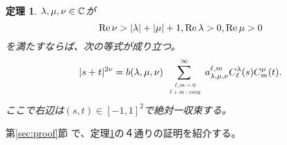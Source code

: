 \documentclass[12pt,a4paper,dvipdfmx]{jsarticle}
\numberwithin{equation}{section}
\newcommand{\myre}[1]{\tmop{Re} #1}
\newcommand{\tmop}[1]{\ensuremath{\operatorname{#1}}}
\theoremstyle{jplain}
\newtheorem{thm}{定理}[section]
\theoremstyle{remark}
\theoremstyle{definition}
\newcommand{\doubt}[1]{\fbox{#1}}
\begin{document}
	\begin{thm}\label{prop:exp-st-gg}
		$\lambda,\mu,\nu\in\mathbb{C}$が\begin{equation*}
			\myre{\nu}>\myabs{\lambda}+\myabs{\mu}+1,\myre{\lambda}>0,\myre{\mu}>0
		\end{equation*}を満たすならば、次の等式が成り立つ。
		\begin{equation}
			| s + t |^{2 \nu} =b(\lambda,\mu,\nu) \displaystyle\sum_{\scalebox{0.6}{ $\begin{array}[]{c}
			\ell, m = 0 \\ \ell + m : \tmop{even}
		\end{array}$}}^{\infty} a_{\lambda,\mu,\nu}^{\ell,m} C_\ell^{\lambda} (s) C_m^{\mu} (t).
			\label{eqn:exp-st-gg}
		\end{equation}
		ここで右辺は$(s,t)\in[-1,1]^2$で絶対一\doubt{様}収束する。
	\end{thm}
	第\ref{sec:proof}節
	で、定理\ref{prop:exp-st-gg}の４通りの証明を紹介する。
\end{document}
